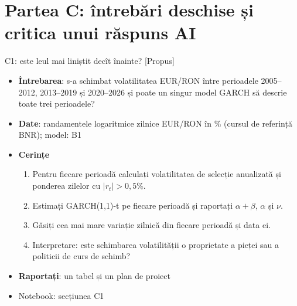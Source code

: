 \section{Partea C: întrebări deschise și critica unui răspuns AI}

\begin{frame}{C1: este leul mai liniștit decît înainte? [Propus]}
\itemsize{\footnotesize}
\begin{itemize}
\item \textbf{Întrebarea}: s-a schimbat volatilitatea EUR/RON între perioadele 2005--2012, 2013--2019 și 2020--2026 și poate un singur model GARCH să descrie toate trei perioadele?
\item \textbf{Date}: randamentele logaritmice zilnice EUR/RON în \% (cursul de referință BNR); model: B1
\item \textbf{Cerințe}
\begin{enumerate}
    \item Pentru fiecare perioadă calculați volatilitatea de selecție anualizată și ponderea zilelor cu $|r_t| > 0{,}5\%$.
    \item Estimați GARCH(1,1)-t pe fiecare perioadă și raportați $\alpha + \beta$, $\alpha$ și $\nu$.
    \item Găsiți cea mai mare variație zilnică din fiecare perioadă și data ei.
    \item Interpretare: este schimbarea volatilității o proprietate a pieței sau a politicii de curs de schimb?
\end{enumerate}
\item \textbf{Raportați}: un tabel și un plan de proiect
\item Notebook: secțiunea C1
\end{itemize}
\end{frame}

